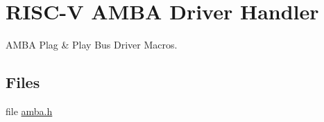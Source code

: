 \hypertarget{group__RTEMSBSPsRISCVGRLIBAMBA}{}\section{R\+I\+S\+C-\/V A\+M\+BA Driver Handler}
\label{group__RTEMSBSPsRISCVGRLIBAMBA}


A\+M\+BA Plag \& Play Bus Driver Macros.  


\subsection*{Files}
\begin{DoxyCompactItemize}
\item 
file \mbox{\hyperlink{riscv_2griscv_2include_2amba_8h}{amba.\+h}}
\end{DoxyCompactItemize}
